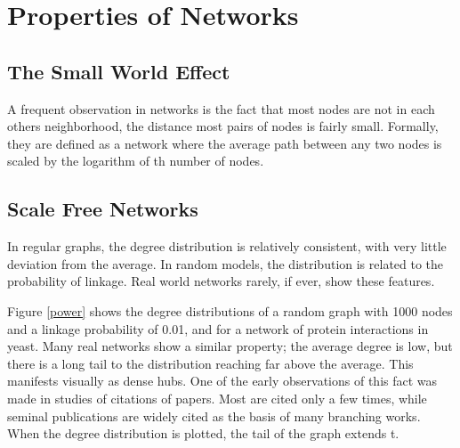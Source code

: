 \section{Properties of Networks}

\subsection{The Small World Effect}

A frequent observation in networks is the fact that most nodes are not in each others neighborhood, the distance most pairs of nodes is fairly small. Formally, they are defined as a network where the average path between any two nodes is scaled by the logarithm of th number of nodes.

\subsection{Scale Free Networks}

In regular graphs, the degree distribution is relatively consistent, with very little deviation from the average. In random models, the distribution is related to the probability of linkage. Real world networks rarely, if ever, show these features.


Figure \ref{power} shows the degree distributions of a random graph with 1000 nodes and a linkage probability of 0.01, and for a network of protein interactions in yeast. Many real networks show a similar property; the average degree is low, but there is a long tail to the distribution reaching far above the average. This manifests visually as dense hubs. One of the early observations of this fact was made in studies of citations of papers. Most are cited only a few times, while seminal publications are widely cited as the basis of many branching works. When the degree distribution is plotted, the tail of the graph extends t.

